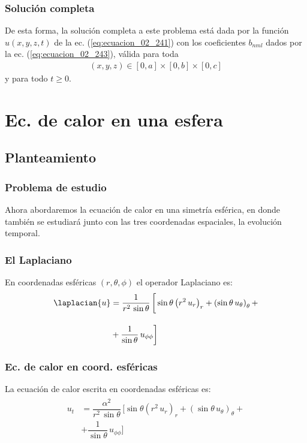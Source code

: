 \begin{frame}
\frametitle{Solución completa}
De esta forma, la solución completa a este problema está dada por la función $u(x, y, z, t)$ de la ec. (\ref{eq:ecuacion_02_241}) con los coeficientes $b_{nml}$ dados por la ec. (\ref{eq:ecuacion_02_243}), válida para toda 
\begin{align}
(x,y,z) \in [0,a] \times [0,b] \times [0,c]
\end{align} 
y para todo $t \geq 0$.
\end{frame}
\section{Ec. de calor en una esfera}
\subsection{Planteamiento}
\begin{frame}
\frametitle{Problema de estudio}
Ahora abordaremos la ecuación de calor en una simetría esférica, en donde también se estudiará junto con las tres coordenadas espaciales, la evolución temporal.
\end{frame}
\begin{frame}
\frametitle{El Laplaciano}
En coordenadas esféricas $(r, \theta, \phi)$ el operador Laplaciano es:
\begin{align}
\begin{aligned}
\laplacian{u} &= \dfrac{1}{r^{2} \, \sin \theta} \, \bigg[ \sin \theta \left( r^{2} \, u_{r} \right)_{r} + \left( \sin \theta \, u_{\theta} \right)_{\theta} + \\[1em]
&+ \dfrac{1}{\sin \theta} \, u_{\phi \phi} \bigg] 
\end{aligned}
\label{eq:ecuacion_02_286}
\end{align}
\end{frame}
\begin{frame}
\frametitle{Ec. de calor en coord. esféricas}
La ecuación de calor escrita en coordenadas esféricas es:
\begin{align}
\begin{aligned}
u_{t} &= \dfrac{\alpha^{2}}{r^{2} \, \sin \theta} \, \bigg[ \sin \theta \left( r^{2} \, u_{r} \right)_{r} + \left( \sin \theta \, u_{\theta} \right)_{\theta} + \\[1em]
&+ \dfrac{1}{\sin \theta} \, u_{\phi \phi} \bigg] 
\end{aligned}
\label{eq:ecuacion_02_287}
\end{align}
\end{frame}
